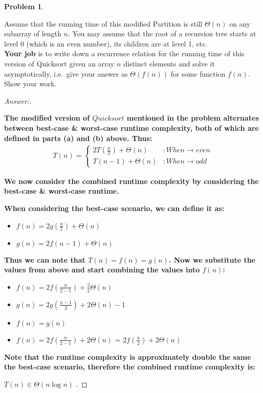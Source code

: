 \documentclass[11pt]{article}
\theoremstyle{definition}
\theoremstyle{definition}
\newtheorem{required}{Problem}
\theoremstyle{definition}
\begin{document}
\begin{required}
\begin{enumerate}[label=(\alph*)]
\noindent Assume that the running time of this modified {\sc Partition} is still $\Theta(n)$ on any subarray of length $n$. You may assume that the root of a recursion tree starts at level $0$ (which is an even number), its children are at level 1, etc. \\
  
\noindent \textbf{Your job} is to write down a recurrence relation for the running time of this version of {\sc Quicksort} given an array $n$ distinct elements and solve it asymptotically, i.e.\ give your answer as $\Theta(f(n))$ for some function $f(n)$. Show your work.

\begin{proof}[Answer:] \

\item \textbf{The modified version of $Quicksort$ mentioned in the problem alternates between best-case \& worst-case runtime complexity, both of which are defined in parts (a) and (b) above. Thus:}
\begin{align*}
T(n) = \begin{cases}
\text{$2T(\frac{n}{2}) + \Theta(n)$} & : When \to even \\
\text{$T(n -1) + \Theta(n)$} & : When \to odd
\end{cases}
\end{align*}
\item \textbf{We now consider the combined runtime complexity by considering the best-case \& worst-case runtime.}
\item \textbf{When considering the best-case scenario, we can define it as:}
\begin{itemize}
\item $f(n) = 2 g(\frac{n}{2}) + \Theta(n)$
\item $g(n) = 2 f(n - 1) + \Theta(n)$
\end{itemize}
\item \textbf{Thus we can note that $T(n) = f(n) = g(n)$. Now we substitute the values from above and start combining the values into $f(n)$:}
\begin{itemize}
\item $f(n) = 2f(\frac{n}{2 - 1}) + \frac{3}{2}\Theta(n)$
\item $g(n) = 2g(\frac{n - 1}{2}) + 2\Theta(n) - 1$
\item $f(n) = g(n)$
\item $f(n) = 2 f(\frac{n}{2 - 1}) + 2\Theta(n)$ = $2f(\frac{n}{2}) + 2\Theta(n)$
\end{itemize}
\item \textbf{Note that the runtime complexity is approximately double the same the best-case scenario, therefore the combined runtime complexity is:}
\item \color{red} $T(n) \in \Theta(n\log n)$ \color{black}.
\end{proof}

\end{enumerate}
\end{required}
\end{document}
